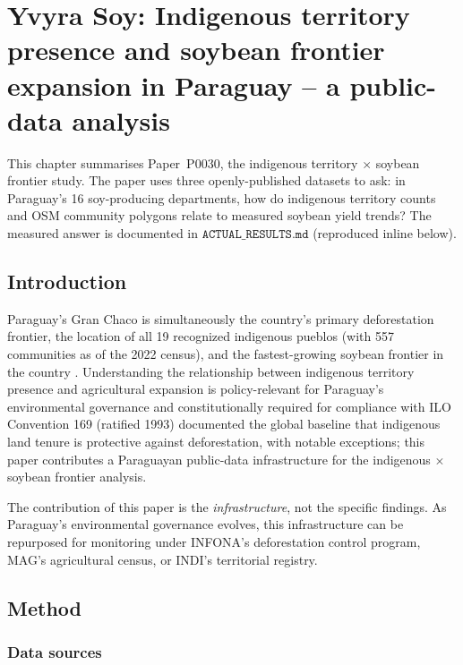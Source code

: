 
\chapter{Yvyra Soy: Indigenous territory presence and soybean frontier
expansion in Paraguay -- a public-data analysis}
\label{ch:yvyra-soy}

This chapter summarises Paper~P0030, the indigenous territory $\times$
soybean frontier study. The paper uses three openly-published
datasets to ask: in Paraguay's 16 soy-producing departments, how do
indigenous territory counts and OSM community polygons relate to
measured soybean yield trends? The measured answer is documented
in $\texttt{ACTUAL\_RESULTS.md}$ (reproduced inline below).

\section{Introduction}
\label{sec:yvyra-soy-intro}

Paraguay's Gran Chaco is simultaneously the country's primary
deforestation frontier, the location of all 19 recognized
indigenous pueblos (with 557 communities as of the 2022 census),
and the fastest-growing soybean frontier in the country
\citep{cattaneo2019soy}. Understanding the relationship between
indigenous territory presence and agricultural expansion is
policy-relevant for Paraguay's environmental governance and
constitutionally required for compliance with ILO Convention 169
\citep{ilo169} (ratified 1993) \citet{sze2022} documented the global
baseline that indigenous land tenure is protective against
deforestation, with notable exceptions; this paper contributes a
Paraguayan public-data infrastructure for the indigenous $\times$
soybean frontier analysis.

The contribution of this paper is the \emph{infrastructure}, not
the specific findings. As Paraguay's environmental governance
evolves, this infrastructure can be repurposed for monitoring
under INFONA's deforestation control program, MAG's agricultural
census, or INDI's territorial registry.

\section{Method}
\label{sec:yvyra-soy-method}

\subsection{Data sources}

